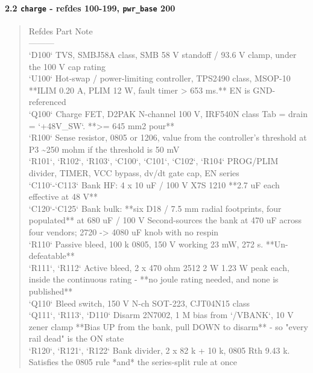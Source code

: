 \documentclass[11pt,a4paper]{article}
\begin{document}
\paragraph*{2.2 \texttt{charge} - refdes 100-199, \texttt{pwr\_base} 200}
\begin{quote}\small\ttfamily\raggedright
\textbar{} Refdes \textbar{} Part \textbar{} Note \textbar{}\\
\textbar{}---\textbar{}---\textbar{}---\textbar{}\\
\textbar{} `D100` \textbar{} TVS, SMBJ58A class, SMB \textbar{} 58 V standoff / 93.6 V clamp, under the 100 V cap rating \textbar{}\\
\textbar{} `U100` \textbar{} Hot-swap / power-limiting controller, TPS2490 class, MSOP-10 \textbar{} {*}{*}ILIM 0.20 A, PLIM 12 W, fault timer \textgreater{} 653 ms.{*}{*} EN is GND-referenced \textbar{}\\
\textbar{} `Q100` \textbar{} Charge FET, D2PAK N-channel 100 V, IRF540N class \textbar{} Tab = drain = `+48V\_SW`. {*}{*}\textgreater{}= 645 mm2 pour{*}{*} \textbar{}\\
\textbar{} `R100` \textbar{} Sense resistor, 0805 or 1206, value from the controller's threshold at P3 \textbar{} \textasciitilde{}250 mohm if the threshold is 50 mV \textbar{}\\
\textbar{} `R101`, `R102`, `R103`, `C100`, `C101`, `C102`, `R104` \textbar{} PROG/PLIM divider, TIMER, VCC bypass, dv/dt gate cap, EN series \textbar{} \textbar{}\\
\textbar{} `C110`-`C113` \textbar{} Bank HF: 4 x 10 uF / 100 V X7S 1210 \textbar{} {*}{*}2.7 uF each effective at 48 V{*}{*} \textbar{}\\
\textbar{} `C120`-`C125` \textbar{} Bank bulk: {*}{*}six D18 / 7.5 mm radial footprints, four populated{*}{*} at 680 uF / 100 V \textbar{} Second-sources the bank at 470 uF across four vendors; 2720 -\textgreater{} 4080 uF knob with no respin \textbar{}\\
\textbar{} `R110` \textbar{} Passive bleed, 100 k 0805, 150 V working \textbar{} 23 mW, 272 s. {*}{*}Un-defeatable{*}{*} \textbar{}\\
\textbar{} `R111`, `R112` \textbar{} Active bleed, 2 x 470 ohm 2512 2 W \textbar{} 1.23 W peak each, inside the continuous rating - {*}{*}no joule rating needed, and none is published{*}{*} \textbar{}\\
\textbar{} `Q110` \textbar{} Bleed switch, 150 V N-ch SOT-223, CJT04N15 class \textbar{} \textbar{}\\
\textbar{} `Q111`, `R113`, `D110` \textbar{} Disarm 2N7002, 1 M bias from `/VBANK`, 10 V zener clamp \textbar{} {*}{*}Bias UP from the bank, pull DOWN to disarm{*}{*} - so "every rail dead" is the ON state \textbar{}\\
\textbar{} `R120`, `R121`, `R122` \textbar{} Bank divider, 2 x 82 k + 10 k, 0805 \textbar{} Rth 9.43 k. Satisfies the 0805 rule {*}and{*} the series-split rule at once \textbar{}
\end{quote}
\end{document}
